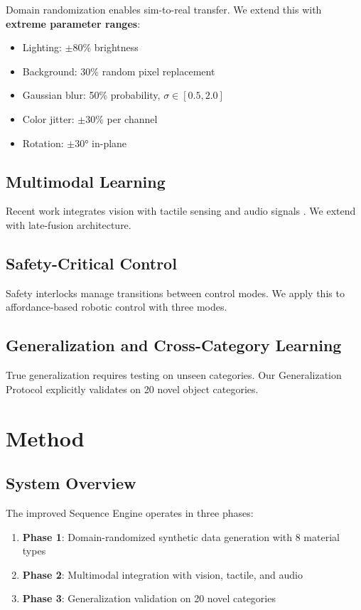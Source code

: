 \documentclass[11pt]{article}
\begin{document}
Domain randomization \citep{Tobin2017,Peng2018} enables sim-to-real transfer. We extend this with \textbf{extreme parameter ranges}:
\begin{itemize}
\item Lighting: $\pm 80\%$ brightness
\item Background: 30\% random pixel replacement
\item Gaussian blur: 50\% probability, $\sigma \in [0.5, 2.0]$
\item Color jitter: $\pm 30\%$ per channel
\item Rotation: $\pm 30°$ in-plane
\end{itemize}

\subsection{Multimodal Learning}

Recent work integrates vision with tactile sensing \citep{Calandra2018} and audio signals \citep{Owens2016}. We extend with late-fusion architecture.

\subsection{Safety-Critical Control}

Safety interlocks \citep{Leveson1995,Sheridan2002} manage transitions between control modes. We apply this to affordance-based robotic control with three modes.

\subsection{Generalization and Cross-Category Learning}

True generalization requires testing on unseen categories. Our Generalization Protocol explicitly validates on 20 novel object categories.

\section{Method}

\subsection{System Overview}

The improved Sequence Engine operates in three phases:

\begin{enumerate}
\item \textbf{Phase 1}: Domain-randomized synthetic data generation with 8 material types
\item \textbf{Phase 2}: Multimodal integration with vision, tactile, and audio
\item \textbf{Phase 3}: Generalization validation on 20 novel categories
\end{enumerate}
\end{document}
